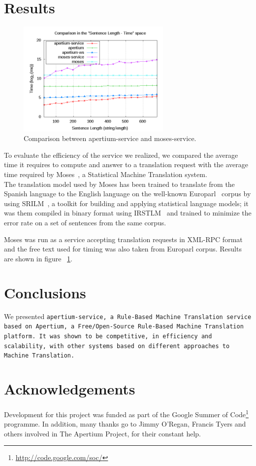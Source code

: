\documentclass[11pt]{article}
\begin{document}
\section{Results}

\begin{figure}[!ht]
\begin{center}
\includegraphics[width=7.5cm]{comp}
\end{center}
\caption{Comparison between apertium-service and moses-service.}
\label{fig:comp}
\end{figure}

To evaluate the efficiency of the service we realized, we compared the average time it requires to compute and answer to a translation request with the average time required 
by Moses~\citep{moses}, a Statistical Machine Translation system.\\

The translation model used by Moses has been trained to translate from the Spanish language to the English language on the well-known Europarl~\citep{europarl} corpus 
by using SRILM~\citep{srilm}, a toolkit for building and applying statistical language models; it was them compiled in binary format using IRSTLM~\citep{irstlm} and trained 
to minimize the error rate on a set of sentences from the same corpus. 

Moses was run as a service accepting translation requests in XML-RPC format and the free text used for timing was also taken from Europarl corpus.
Results are shown in figure ~\ref{fig:comp}.

\section{Conclusions}

We presented \tt{apertium-service}, a Rule-Based Machine Translation service based on Apertium, a Free/Open-Source Rule-Based Machine Translation platform.
It was shown to be competitive, in efficiency and scalability, with other systems based on different approaches to Machine Translation.

\section*{Acknowledgements}

Development for this project was funded as part of the Google Summer of Code\footnote{\url{http://code.google.com/soc/}} programme. 
In addition, many thanks go to Jimmy O'Regan, Francis Tyers and others involved in The Apertium Project, for their constant help.




\end{document}

